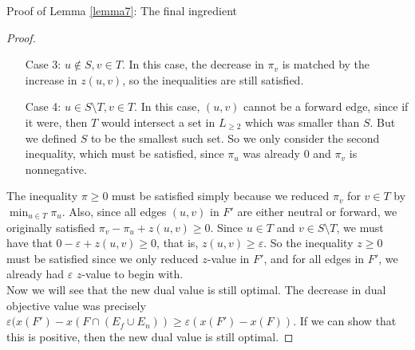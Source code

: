 \documentclass[./main.tex]{subfiles}
\begin{document}
\begin{subsection}{Proof of Lemma \ref{lemma7}: The final ingredient}
\begin{proof}
\begin{itemize}
		\item[Case 3:] $u\notin S, v\in T$. In this case, the decrease in $\pi_v$ is matched by the increase in $z(u,v)$, so the inequalities are still satisfied.
		\item[Case 4:] $u\in S\setminus T, v\in T$. In this case, $(u,v)$ cannot be a forward edge, since if it were, then $T$ would intersect a set in $L_{\geq 2}$ which was smaller than $S$. But we defined $S$ to be the smallest such set. So we only consider the second inequality, which must be satisfied, since $\pi_u$ was already $0$ and $\pi_v$ is nonnegative.
		\end{itemize}
		The inequality $\pi\geq 0$ must be satisfied simply because we reduced $\pi_v$ for $v\in T$ by $\min_{u\in T}\pi_u$. 
		Also, since all edges $(u,v)$ in $F'$ are either neutral or forward, we originally satisfied $\pi_v - \pi_u + z(u,v)\geq 0$. Since $u\in T$ and $v\in S\setminus T$, we must have that $0 - \varepsilon + z(u,v)\geq 0$, that is, $z(u,v)\geq \varepsilon$. 
So the inequality $z\geq 0$ must be satisfied since we only reduced $z$-value in $F'$, and for all edges in $F'$, we already had $\varepsilon$ $z$-value to begin with.\vspace{2mm}
\\Now we will see that the new dual value is still optimal. The decrease in dual objective value was precisely $\varepsilon (x(F') - x(F\cap( E_f\cup E_n))\geq \varepsilon(x(F') - x(F))$. If we can show that this is positive, then the new dual value is still optimal.

	\end{proof}
	\end{subsection}
\end{document}
